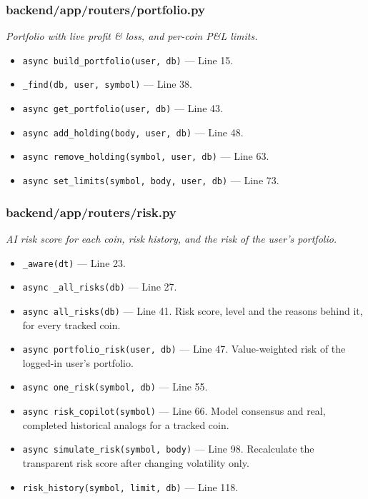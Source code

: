\subsubsection*{backend/app/routers/portfolio.py}
\textit{Portfolio with live profit \& loss, and per-coin P\&L limits.}
\begin{itemize}[nosep,leftmargin=1.5em]
\item \texttt{async build\_\allowbreak{}portfolio(\allowbreak{}user,\allowbreak{} db)} --- Line 15.
\item \texttt{\_\allowbreak{}find(\allowbreak{}db,\allowbreak{} user,\allowbreak{} symbol)} --- Line 38.
\item \texttt{async get\_\allowbreak{}portfolio(\allowbreak{}user,\allowbreak{} db)} --- Line 43.
\item \texttt{async add\_\allowbreak{}holding(\allowbreak{}body,\allowbreak{} user,\allowbreak{} db)} --- Line 48.
\item \texttt{async remove\_\allowbreak{}holding(\allowbreak{}symbol,\allowbreak{} user,\allowbreak{} db)} --- Line 63.
\item \texttt{async set\_\allowbreak{}limits(\allowbreak{}symbol,\allowbreak{} body,\allowbreak{} user,\allowbreak{} db)} --- Line 73.
\end{itemize}
\subsubsection*{backend/app/routers/risk.py}
\textit{AI risk score for each coin, risk history, and the risk of the user's portfolio.}
\begin{itemize}[nosep,leftmargin=1.5em]
\item \texttt{\_\allowbreak{}aware(\allowbreak{}dt)} --- Line 23.
\item \texttt{async \_\allowbreak{}all\_\allowbreak{}risks(\allowbreak{}db)} --- Line 27.
\item \texttt{async all\_\allowbreak{}risks(\allowbreak{}db)} --- Line 41. Risk score, level and the reasons behind it, for every tracked coin.
\item \texttt{async portfolio\_\allowbreak{}risk(\allowbreak{}user,\allowbreak{} db)} --- Line 47. Value-weighted risk of the logged-in user's portfolio.
\item \texttt{async one\_\allowbreak{}risk(\allowbreak{}symbol,\allowbreak{} db)} --- Line 55.
\item \texttt{async risk\_\allowbreak{}copilot(\allowbreak{}symbol)} --- Line 66. Model consensus and real, completed historical analogs for a tracked coin.
\item \texttt{async simulate\_\allowbreak{}risk(\allowbreak{}symbol,\allowbreak{} body)} --- Line 98. Recalculate the transparent risk score after changing volatility only.
\item \texttt{risk\_\allowbreak{}history(\allowbreak{}symbol,\allowbreak{} limit,\allowbreak{} db)} --- Line 118.
\end{itemize}
